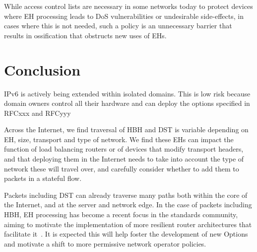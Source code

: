 \documentclass[conference]{IEEEtran}
\begin{document}
While access control lists are necessary in some networks today to protect devices where EH processing leads to DoS vulnerabilities or undesirable side-effects, in cases where this is not needed, such a policy is an unnecessary barrier that results in ossification that obstructs new uses of EHs.


\section{Conclusion}
\label{sec:conclusion}


IPv6 is actively being extended within isolated domains. This is low risk because domain owners control all their hardware and can deploy the options specified in RFCxxx and RFCyyy

Across the Internet, we find traversal of HBH and DST is variable depending on EH, size, transport and type of network. We find these EHs can impact the function of load balancing routers or of devices that modify transport headers, and that deploying them in the Internet needs to take into account the type of network these will travel over, and carefully consider whether to add them to packets in a stateful flow.


Packets including DST can already traverse many paths both within the core of the Internet, and at the server and network edge. In the case of packets including HBH, 
EH processing has become a recent focus in the standards community, aiming to motivate the implementation of more resilient router architectures that facilitate it~\cite{ietf-6man-HBH-processing-06, ietf-v6ops-HBH-03, ietf-6man-eh-limits-02}. 
It is expected this will help foster the development of new Options and motivate a shift to more permissive network operator policies.





\small

\end{document}
